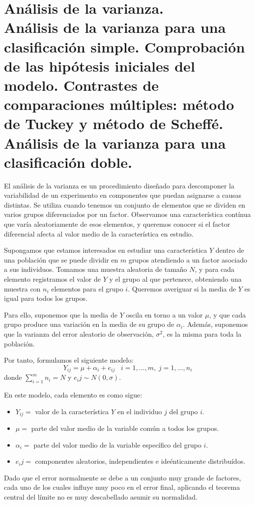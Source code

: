 \chapter[An\'alisis de la varianza.]{An\'alisis de la varianza. \\
\normalsize An\'alisis de la varianza para una clasificaci\'on simple. Comprobaci\'on de las hip\'otesis iniciales del modelo. Contrastes de comparaciones m\'ultiples: m\'etodo de Tuckey y m\'etodo de Scheff\'e. An\'alisis de la varianza para una clasificaci\'on doble.}

El an\'alisis de la varianza es un procedimiento dise\~nado para descomponer la variabilidad de un experimento en componentes que puedan asignarse a causas distintas. Se utiliza cuando tenemos un conjunto de elementos que se dividen en varios grupos diferenciados por un factor. Observamos una caracter\'istica cont\'inua que var\'ia aleatoriamente de esos elementos, y queremos conocer si el factor diferencial afecta al valor medio de la caracter\'istica en estudio.


Supongamos que estamos interesados en estudiar una caracter\'istica $Y$ dentro de una poblaci\'on que se puede dividir en $m$ grupos atendiendo a un factor asociado a sus individuos. Tomamos una muestra aleatoria de tama\~no $N$, y para cada elemento registramos el valor de $Y$ y el grupo al que pertenece, obteniendo una muestra con $n_i$ elementos para el grupo $i$. Queremos averiguar si la media de $Y$ es igual para todos los grupos.

Para ello, suponemos que la media de $Y$ oscila en torno a un valor $\mu$, y que cada grupo produce una variaci\'on en la media de su grupo de $\alpha_i$. Adem\'as, suponemos que la varianza del error aleatorio de observaci\'on, $\sigma^2$, es la misma para toda la poblaci\'on.

Por tanto, formulamos el siguiente modelo:
\[Y_{ij}=\mu+\alpha_i+e_{ij}\;\;\;i=1,\ldots,m,\;j=1,\ldots,n_i\]
donde $\sum_{i=1}^{m}n_i=N$ y $e_ij\sim N(0,\sigma)$.

En este modelo, cada elemento es como sigue:
\begin{itemize}
\item $Y_{ij} =$ valor de la caracter\'istica $Y$ en el individuo $j$ del grupo $i$.
\item $\mu =$ parte del valor medio de la variable com\'un a todos los grupos.
\item $\alpha_i = $ parte del valor medio de la variable espec\'ifico del grupo $i$.
\item $e_ij=$ componentes aleatorios, independientes e ide\'enticamente distribu\'idos.
\end{itemize}

Dado que el error normalmente se debe a un conjunto muy grande de factores, cada uno de los cuales influye muy poco en el error final, aplicando el teorema central del l\'imite no es muy descabellado asumir su normalidad.


